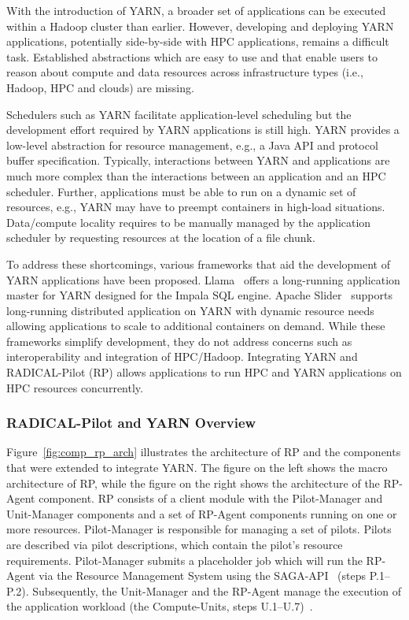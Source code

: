 With the introduction of YARN, a broader set of applications can be executed
within a Hadoop cluster than earlier. However, developing and deploying YARN
applications, potentially side-by-side with HPC applications, remains a
difficult task. Established abstractions which are easy to use and that enable
users to reason about compute and data resources across infrastructure types
(i.e., Hadoop, HPC and clouds) are missing.

Schedulers such as YARN facilitate application-level scheduling but the
development effort required by YARN applications is still high. YARN provides a
low-level abstraction for resource management, e.g., a Java API and protocol
buffer specification. Typically, interactions between YARN and applications are
much more complex than the interactions between an application and an HPC
scheduler. Further, applications must be able to run on a dynamic set of
resources, e.g., YARN may have to preempt containers in high-load situations.
Data/compute locality requires to be manually managed by the application scheduler
by requesting resources at the location of a file chunk.

To address these shortcomings, various frameworks that aid the development of
YARN applications have been proposed. Llama~\cite{llama} offers a long-running
application master for YARN designed for the Impala SQL engine. Apache
Slider~\cite{apache-slider} supports long-running distributed application on
YARN with dynamic resource needs allowing applications to scale to additional
containers on demand. While these frameworks simplify development, they do not
address concerns such as interoperability and integration of HPC/Hadoop.
Integrating YARN and RADICAL-Pilot (RP) allows applications to run HPC and YARN
applications on HPC resources concurrently.

\subsubsection*{RADICAL-Pilot and YARN Overview}
\label{sssec:rp_yarn}

Figure~\ref{fig:comp_rp_arch} illustrates the architecture of RP and
the components that were extended to integrate YARN. The figure on the left
shows the macro architecture of RP, while the figure on the right
shows the architecture of the RP-Agent component. RP
consists of a client module with the Pilot-Manager and Unit-Manager components
and a set of RP-Agent components running on one or more resources.
Pilot-Manager is responsible for managing a set of pilots. Pilots are described
via pilot descriptions, which contain the pilot's resource requirements.
Pilot-Manager submits a placeholder job which will run the RP-Agent
via the Resource Management System using the SAGA-API~\cite{merzky2015saga}
(steps P.1--P.2). Subsequently, the Unit-Manager and the RP-Agent
manage the execution of the application workload (the Compute-Units, steps
U.1--U.7)~\cite{merzky2019using}.

